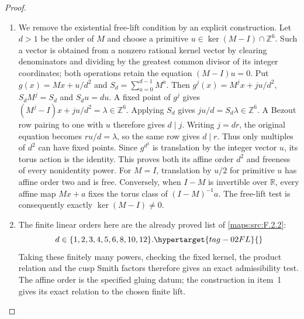 \documentclass[11pt,a4paper]{article}
\numberwithin{equation}{section}
\theoremstyle{definition}
\begin{document}
\begin{proof}
\begin{enumerate}[label=\arabic*.]
\item We remove the existential free-lift condition by an explicit
construction. Let $d>1$ be the order of $M$ and choose a primitive
$u\in\ker(M-I)\cap\mathbb Z^6$. Such a vector is obtained from a
nonzero rational kernel vector by clearing denominators and dividing
by the greatest common divisor of its integer coordinates; both
operations retain the equation $(M-I)u=0$. Put
$g(x)=Mx+u/d^2$ and $S_d=\sum_{a=0}^{d-1}M^a$.
Then $g^j(x)=M^jx+ju/d^2$, $S_dM^j=S_d$ and $S_du=du$.
A fixed point of $g^j$ gives
$(M^j-I)x+ju/d^2=\lambda\in\mathbb Z^6$.
Applying $S_d$ gives $ju/d=S_d\lambda\in\mathbb Z^6$.
A Bezout row pairing to one with $u$ therefore gives $d\mid j$.
Writing $j=dr$, the original equation becomes $ru/d=\lambda$,
so the same row gives $d\mid r$. Thus only multiples of $d^2$
can have fixed points. Since $g^{d^2}$ is translation by the
integer vector $u$, its torus action is the identity. This proves
both its affine order $d^2$ and freeness of every nonidentity power.
For $M=I$, translation by $u/2$ for primitive $u$ has affine order
two and is free. Conversely, when $I-M$ is invertible over
$\mathbb R$, every affine map $Mx+a$ fixes the torus class of
$(I-M)^{-1}a$. The free-lift test is consequently exactly
$\ker(M-I)\ne0$.

\item The finite linear orders here are the already proved list of
\cref{maps:src:F.2.2}:
\begin{equation}
 d\in\{1,2,3,4,5,6,8,10,12\}.
 \hypertarget{tag-02FL}{}\label{maps:eq:F.CN1}
\end{equation}
Taking these finitely many powers, checking the fixed kernel,
the product relation and the cusp Smith factors therefore gives
an exact admissibility test. The affine order is the
specified gluing datum; the construction in item~1 gives
its exact relation to the chosen finite lift.


\end{enumerate}
\end{proof}
\end{document}
